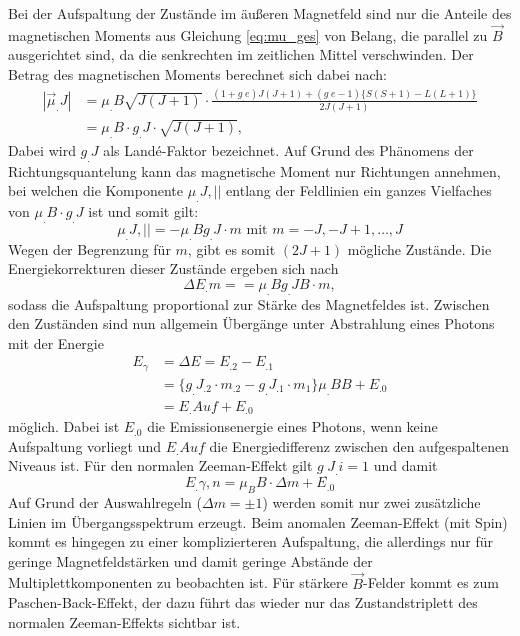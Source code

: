 Bei der Aufspaltung der Zustände im äußeren Magnetfeld sind nur die Anteile des magnetischen Moments aus Gleichung \eqref{eq:mu_ges} von Belang, die parallel zu $\vec{B}$ ausgerichtet sind, da die senkrechten im zeitlichen Mittel verschwinden.
Der Betrag des magnetischen Moments berechnet sich dabei nach:
\[
\begin{split}
|\vec{\mu}_.J|&=\mu_.B \sqrt{J(J+1)} \cdot \frac{(1+g_.e) J (J+1) + (g_.e-1)\{S(S+1)-L(L+1)\}}{2 J (J+1)}\\
&= \mu_.B\cdot g_.J \cdot\sqrt{J(J+1)},
\end{split}
\]
Dabei wird $g_.J$ als Landé-Faktor bezeichnet. Auf Grund des Phänomens der Richtungsquantelung kann das magnetische Moment nur Richtungen annehmen, bei welchen die Komponente $\mu_.{J,||}$ entlang der Feldlinien ein ganzes Vielfaches von $\mu_.B \cdot g_.J$ ist und somit gilt:
\[
\mu_.{J, ||}=-\mu_.B g_.J \cdot m \text{ mit } m=-J,-J+1,\hdots, J
\]
Wegen der Begrenzung für $m$, gibt es somit $(2J+1)$ mögliche Zustände.
Die Energiekorrekturen dieser Zustände ergeben sich nach
\[
\Delta E_.m = = \mu_.B g_.J B \cdot m,
\]
sodass die Aufspaltung proportional zur Stärke des Magnetfeldes ist.
Zwischen den Zuständen sind nun allgemein Übergänge unter Abstrahlung eines Photons mit der Energie
\begin{equation*} 
	\begin{split}
	E_\gamma &= \Delta E = E_.2-E_.1 \\
	&=\{g_.{J_.2} \cdot m_.2-g_.{J_.1} \cdot m_1 \} \mu_.B B  + E_.0\\
	&=E_.{Auf}+E_.0
	\end{split}
\end{equation*}
möglich.
Dabei ist $E_.0$ die Emissionsenergie eines Photons, wenn keine Aufspaltung vorliegt und $E_.{Auf}$ die Energiedifferenz zwischen den aufgespaltenen Niveaus ist.
Für den normalen Zeeman-Effekt gilt $g_.{J_.i}=1$ und damit
\begin{equation}
E_.{\gamma,n} = \mu_B B \cdot \Delta m + E_.0
\end{equation}
Auf Grund der Auswahlregeln ($\Delta m = \pm 1$) werden somit nur zwei zusätzliche Linien im Übergangsspektrum erzeugt.
Beim anomalen Zeeman-Effekt (mit Spin) kommt es hingegen zu einer komplizierteren Aufspaltung, die allerdings nur für geringe Magnetfeldstärken und damit geringe Abstände der Multiplettkomponenten zu beobachten ist.
Für stärkere $\vec{B}$-Felder kommt es zum Paschen-Back-Effekt, der dazu führt das wieder nur das Zustandstriplett des normalen Zeeman-Effekts sichtbar ist.


